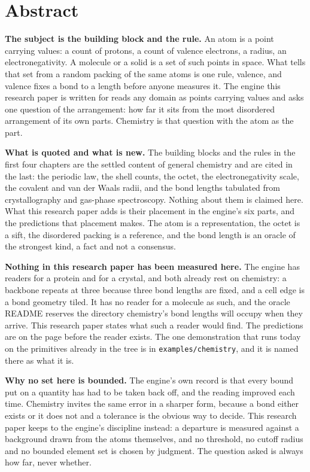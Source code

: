 \chapter*{Abstract}

\textbf{The subject is the building block and the rule.} An atom is a point carrying values: a
count of protons, a count of valence electrons, a radius, an electronegativity. A molecule or a
solid is a set of such points in space. What tells that set from a random packing of the same atoms
is one rule, valence, and valence fixes a bond to a length before anyone measures it. The engine
this research paper is written for reads any domain as points carrying values and asks one question of the
arrangement: how far it sits from the most disordered arrangement of its own parts. Chemistry is
that question with the atom as the part.

\textbf{What is quoted and what is new.} The building blocks and the rules in the first four
chapters are the settled content of general chemistry and are cited in the last: the periodic law,
the shell counts, the octet, the electronegativity scale, the covalent and van der Waals radii, and
the bond lengths tabulated from crystallography and gas-phase spectroscopy. Nothing about them is
claimed here. What this research paper adds is their placement in the engine's six parts, and the predictions
that placement makes. The atom is a representation, the octet is a sift, the disordered packing is a
reference, and the bond length is an oracle of the strongest kind, a fact and not a consensus.

\textbf{Nothing in this research paper has been measured here.} The engine has readers for a protein and for a
crystal, and both already rest on chemistry: a backbone repeats at three because three bond lengths
are fixed, and a cell edge is a bond geometry tiled. It has no reader for a molecule as such, and
the oracle README reserves the directory chemistry's bond lengths will occupy when they arrive. This
research paper states what such a reader would find. The predictions are on the page before the reader
exists. The one demonstration that runs today on the primitives already in the tree is in
\texttt{examples/chemistry}, and it is named there as what it is.

\textbf{Why no set here is bounded.} The engine's own record is that every bound put on a quantity
has had to be taken back off, and the reading improved each time. Chemistry invites the same error
in a sharper form, because a bond either exists or it does not and a tolerance is the obvious way to
decide. This research paper keeps to the engine's discipline instead: a departure is measured against a
background drawn from the atoms themselves, and no threshold, no cutoff radius and no bounded element
set is chosen by judgment. The question asked is always how far, never whether.
